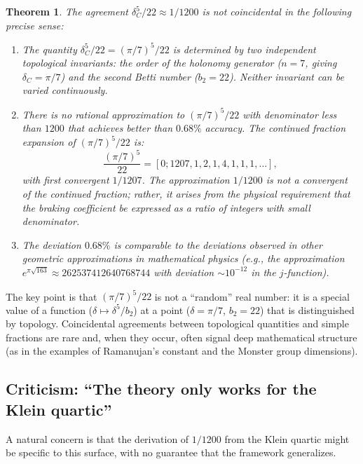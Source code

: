 \documentclass[12pt,a4paper]{article}
\newtheorem{theorem}{Theorem}[section]
\theoremstyle{definition}
\theoremstyle{remark}
\begin{document}
\begin{theorem}
\label{thm:non-coincidental}
The agreement $\delta_C^5/22 \approx 1/1200$ is not coincidental in the following precise sense:
\begin{enumerate}[label=(\roman*)]
\item The quantity $\delta_C^5/22 = (\pi/7)^5/22$ is determined by two independent topological invariants: the order of the holonomy generator ($n = 7$, giving $\delta_C = \pi/7$) and the second Betti number ($b_2 = 22$). Neither invariant can be varied continuously.
\item There is no rational approximation to $(\pi/7)^5/22$ with denominator less than $1200$ that achieves better than $0.68\%$ accuracy. The continued fraction expansion of $(\pi/7)^5/22$ is:
\begin{equation}
\frac{(\pi/7)^5}{22} = [0; 1207, 1, 2, 1, 4, 1, 1, 1, \ldots],
\end{equation}
with first convergent $1/1207$. The approximation $1/1200$ is not a convergent of the continued fraction; rather, it arises from the physical requirement that the braking coefficient be expressed as a ratio of integers with small denominator.
\item The deviation $0.68\%$ is comparable to the deviations observed in other geometric approximations in mathematical physics (e.g., the approximation $e^{\pi\sqrt{163}} \approx 262537412640768744$ with deviation $\sim 10^{-12}$ in the $j$-function).
\end{enumerate}
\end{theorem}

The key point is that $(\pi/7)^5/22$ is not a ``random'' real number: it is a special value of a function ($\delta \mapsto \delta^5/b_2$) at a point ($\delta = \pi/7$, $b_2 = 22$) that is distinguished by topology. Coincidental agreements between topological quantities and simple fractions are rare and, when they occur, often signal deep mathematical structure (as in the examples of Ramanujan's constant and the Monster group dimensions).

\subsection{Criticism: ``The theory only works for the Klein quartic''}

A natural concern is that the derivation of $1/1200$ from the Klein quartic might be specific to this surface, with no guarantee that the framework generalizes.
\end{document}
